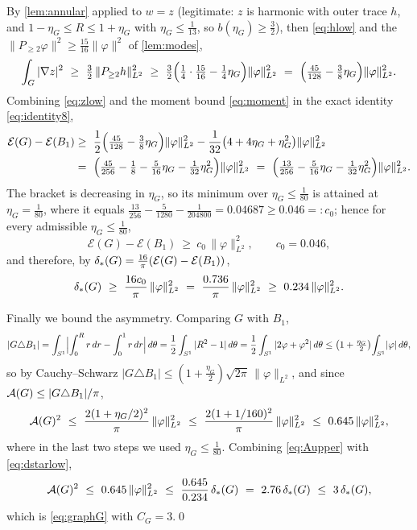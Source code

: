 By \cref{lem:annular} applied to $w=z$ (legitimate: $z$ is harmonic with
outer trace $h$, and $1-\eta_G\le R\le1+\eta_G$ with $\eta_G\le\tfrac1{13}$,
so $b(\eta_G)\ge\tfrac32$), then \eqref{eq:hlow} and the
$\|P_{\ge2}\varphi\|^2\ge\tfrac{15}{16}\|\varphi\|^2$ of \cref{lem:modes},
\begin{equation}\label{eq:zlow}
   \int_G|\nabla z|^2
   \ \ge\ \tfrac32\,\|P_{\ge2}h\|_{L^2}^2
   \ \ge\ \tfrac32\Bigl(\tfrac14\cdot\tfrac{15}{16}-\tfrac14\eta_G\Bigr)
          \|\varphi\|_{L^2}^2
   \ =\ \Bigl(\tfrac{45}{128}-\tfrac38\eta_G\Bigr)\|\varphi\|_{L^2}^2 .
\end{equation}
Combining \eqref{eq:zlow} and the moment bound \eqref{eq:moment} in the exact
identity \eqref{eq:identity8},
\begin{equation}\label{eq:deffinal}
\begin{aligned}
   \mathcal E(G)-\mathcal E(B_1)
   &\ge\ \frac12\Bigl(\tfrac{45}{128}-\tfrac38\eta_G\Bigr)\|\varphi\|_{L^2}^2
        -\frac1{32}\bigl(4+4\eta_G+\eta_G^2\bigr)\|\varphi\|_{L^2}^2\\
   &=\ \Bigl(\tfrac{45}{256}-\tfrac18-\tfrac5{16}\eta_G-\tfrac1{32}\eta_G^2\Bigr)
        \|\varphi\|_{L^2}^2
   \ =\ \Bigl(\tfrac{13}{256}-\tfrac5{16}\eta_G-\tfrac1{32}\eta_G^2\Bigr)
        \|\varphi\|_{L^2}^2 .
\end{aligned}
\end{equation}
The bracket is decreasing in $\eta_G$, so its minimum over $\eta_G\le\tfrac1{80}$
is attained at $\eta_G=\tfrac1{80}$, where it equals
$\tfrac{13}{256}-\tfrac5{1280}-\tfrac1{204800}=0.04687\ge0.046=:c_0$; hence
for every admissible $\eta_G\le\tfrac1{80}$,
\begin{equation}\label{eq:Edown}
   \mathcal E(G)-\mathcal E(B_1)\ \ge\ c_0\,\|\varphi\|_{L^2}^2,
   \qquad c_0=0.046,
\end{equation}
and therefore, by $\delta_{*}(G)=\tfrac{16}\pi(\mathcal E(G)-\mathcal E(B_1))$,
\begin{equation}\label{eq:dstarlow}
   \delta_{*}(G)\ \ge\ \frac{16 c_0}\pi\,\|\varphi\|_{L^2}^2
   \ =\ \frac{0.736}\pi\,\|\varphi\|_{L^2}^2
   \ \ge\ 0.234\,\|\varphi\|_{L^2}^2 .
\end{equation}

Finally we bound the asymmetry. Comparing $G$ with $B_1$,
\[
   |G\triangle B_1|=\int_{S^1}\Bigl|\int_0^{R}r\,dr-\int_0^1 r\,dr\Bigr|\,d\theta
   =\frac12\int_{S^1}|R^2-1|\,d\theta
   =\frac12\int_{S^1}|2\varphi+\varphi^2|\,d\theta
   \le\bigl(1+\tfrac{\eta_G}2\bigr)\!\int_{S^1}\!|\varphi|\,d\theta,
\]
so by Cauchy--Schwarz $|G\triangle B_1|\le(1+\tfrac{\eta_G}2)\sqrt{2\pi}\,
\|\varphi\|_{L^2}$, and since $\mathcal{A}(G)\le|G\triangle B_1|/\pi$,
\begin{equation}\label{eq:Aupper}
   \AF(G)^2\ \le\ \frac{2(1+\eta_G/2)^2}\pi\,\|\varphi\|_{L^2}^2
   \ \le\ \frac{2(1+1/160)^2}\pi\,\|\varphi\|_{L^2}^2\ \le\ 0.645\,\|\varphi\|_{L^2}^2 ,
\end{equation}
where in the last two steps we used $\eta_G\le\tfrac1{80}$. Combining
\eqref{eq:Aupper} with \eqref{eq:dstarlow},
\[
   \AF(G)^2\ \le\ 0.645\,\|\varphi\|_{L^2}^2
   \ \le\ \frac{0.645}{0.234}\,\dstar(G)\ =\ 2.76\,\dstar(G)\ \le\ 3\,\dstar(G),
\]
which is \eqref{eq:graphG} with $C_G=3$.\qed

